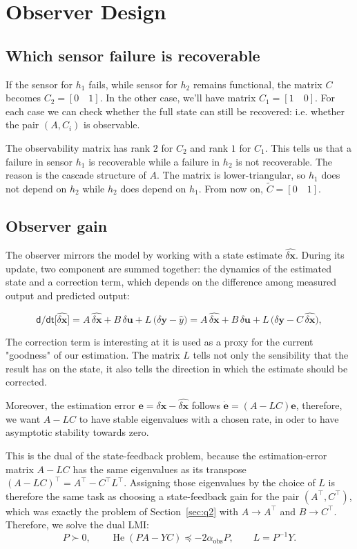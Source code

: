 \documentclass[10pt,a4paper]{scrartcl}
\newcommand{\RuleSection}[1]{%
\section{#1}%
\vspace{0.2em}{\color{accent!35}\hrule height 0.4pt}\vspace{0.3em}%
}
\begin{document}
\RuleSection{Observer Design}
\label{sec:q3}

\subsection{Which sensor failure is recoverable}
If the sensor for $h_1$ fails, while sensor for $h_2$ remains functional, the matrix $C$ becomes $C_2 = [0\quad 1]$. In the other case, we'll have matrix $C_1 = [1\quad 0]$. For each case we can check whether the full state can still be recovered: i.e. whether the pair $(A,C_i)$ is observable. 

The observability matrix has rank $2$ for $C_2$ and rank $1$ for $C_1$. This tells us that a failure in sensor $h_1$ is recoverable while a failure in $h_2$ is not recoverable. The reason is the cascade structure of $A$. The matrix is lower-triangular, so $h_1$ does not depend on $h_2$ while $h_2$ does depend on $h_1$.  From now on, $\tilde C = [0 \quad 1]$.


\subsection{Observer gain}

The observer mirrors the model by working with a state estimate $\widehat{\delta \bm x}$. During its update, two component are summed together: the dynamics of the estimated state and a correction term, which depends on the difference among measured output and predicted output: 

\begin{equation}
    \mathsf{d/dt}\Big[\widehat{\delta\bm{x}}\Big]
    = A\,\widehat{\delta\bm{x}} + B\,\delta\bm{u}
      + L\,\big(\delta\bm{y}- \widehat y\big)
    = A\,\widehat{\delta\bm{x}} + B\,\delta\bm{u}
      + L\,\big(\delta\bm{y}-C\,\widehat{\delta\bm{x}}\big),
    \label{eq:q3_obs}
\end{equation}

The correction term is interesting at it is used as a proxy for the current "goodness" of our estimation. The matrix $L$ tells not only the sensibility that the result has on the state, it also tells the direction in which the estimate should be corrected. 

Moreover, the estimation error $\bm{e}=\delta\bm{x}-\widehat{\delta\bm{x}}$ follows $\dot{\bm{e}}=(A-LC)\bm{e}$, therefore, we want $A-LC$ to have stable eigenvalues with a chosen rate, in oder to have asymptotic stability towards zero. 

This is the dual of the state-feedback problem, because the estimation-error matrix $A-LC$ has the same eigenvalues as its transpose $(A-LC)^\top = A^\top - C^\top L^\top$. Assigning those eigenvalues by the choice of $L$ is therefore the same task as choosing a state-feedback gain for the pair $(A^\top,C^\top)$, which was exactly the problem of Section~\ref{sec:q2} with $A\to A^\top$ and $B\to C^\top$. Therefore, we solve the dual LMI:
\begin{equation}
    P\succ0,\qquad \operatorname{He}(PA-YC)\preceq-2\alpha_{\mathrm{obs}}P,
    \qquad L=P^{-1}Y .
    \label{eq:q3_lmi}
\end{equation}
\end{document}
